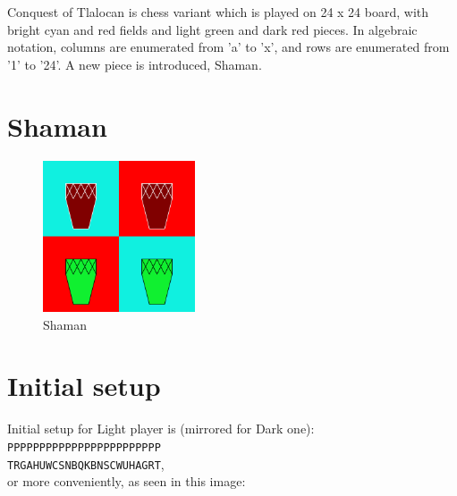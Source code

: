 \documentclass[a5paper,12pt,draft]{book} %
\begin{document}
Conquest of Tlalocan is chess variant which is played on 24 x 24 board,
with bright cyan and red fields and light green and dark red pieces.
In algebraic notation, columns are enumerated from 'a' to 'x', and rows
are enumerated from '1' to '24'. A new piece is introduced, Shaman.

\clearpage

\section*{Shaman}

\noindent
\begin{figure}
\includegraphics[width=0.4\textwidth, keepaspectratio=true]{../gfx/pieces/14_shaman.png}
\caption{Shaman}
\label{fig:shaman}
\end{figure}

\clearpage

\section*{Initial setup}

Initial setup for Light player is (mirrored for Dark one):
\texttt{PPPPPPPPPPPPPPPPPPPPPPPP \\
        TRGAHUWCSNBQKBNSCWUHAGRT}, \\
or more conveniently, as seen in this image:
\end{document}
